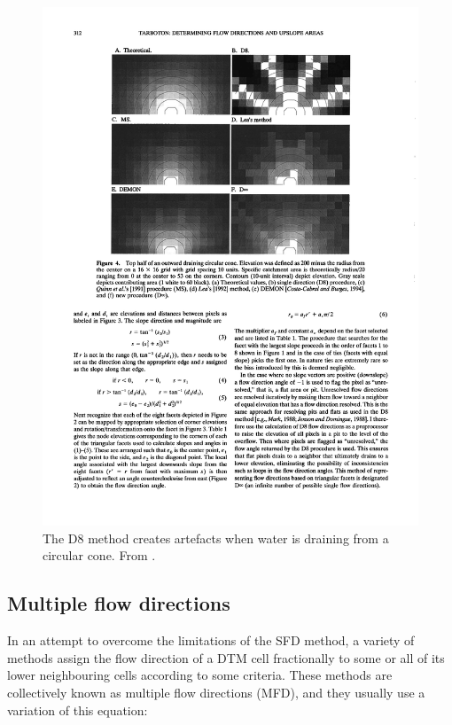 \begin{figure}
\centering
\includegraphics[width=0.95\linewidth]{figs/d8.pdf}
\caption{The D8 method creates artefacts when water is draining from a circular cone. From \citet{Tarborton97}.}%
\label{fig:d8}
\end{figure}

\subsection{Multiple flow directions}

In an attempt to overcome the limitations of the SFD method, a variety of methods assign the flow direction of a DTM cell fractionally to some or all of its lower neighbouring cells according to some criteria.
These methods are collectively known as multiple flow directions (MFD), 
and they usually use a variation of this equation:

